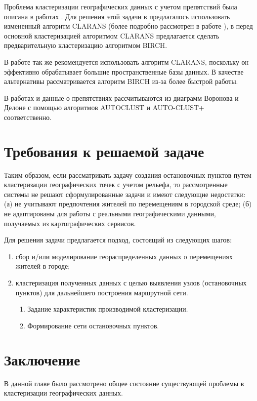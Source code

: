Проблема кластеризации географических данных с учетом препятствий была описана в работах \cite{presence, cod}. Для решения этой задачи в \cite{presence} предлагалось использовать измененный алгоритм CLARANS (более подробно рассмотрен в работе \cite{cod}), в \cite{cod} перед основной кластеризацией алгоритмом CLARANS предлагается сделать предварительную кластеризацию алгоритмом BIRCH.

В работе \cite{koperski} так же рекомендуется использовать алгоритм CLARANS, поскольку он эффективно обрабатывает большие пространственные базы данных. В качестве альтернативы рассматривается алгоритм BIRCH из-за более быстрой работы.

В работах \cite{estivill} и \cite{obstacles} данные о препятствиях рассчитываются из диаграмм Воронова и Делоне с помощью алгоритмов AUTOCLUST и AUTO-CLUST+ соответственно.

\section{Требования к решаемой задаче}
Таким образом, если рассматривать задачу создания остановочных пунктов путем кластеризации географических точек с учетом рельефа, то рассмотренные системы не решают сформулированные задачи и имеют следующие недостатки: (а) не учитывают предпочтения жителей по перемещениям в городской среде; (б) не адаптированы для работы с реальными географическими данными, получаемых из картографических сервисов.

Для решения задачи предлагается подход, состоящий из следующих шагов:
\begin{enumerate}
    \item сбор и/или моделирование геораспределенных данных о перемещениях жителей в городе;
    \item кластеризация полученных данных с целью выявления узлов (остановочных пунктов) для дальнейшего построения маршрутной сети.
    \begin{enumerate}
        \item Задание характеристик производимой кластеризации.
        \item Формирование сети остановочных пунктов.
    \end{enumerate}
\end{enumerate}

\section{Заключение}
В данной главе было рассмотрено общее состояние существующей проблемы в кластеризации географических данных. 
